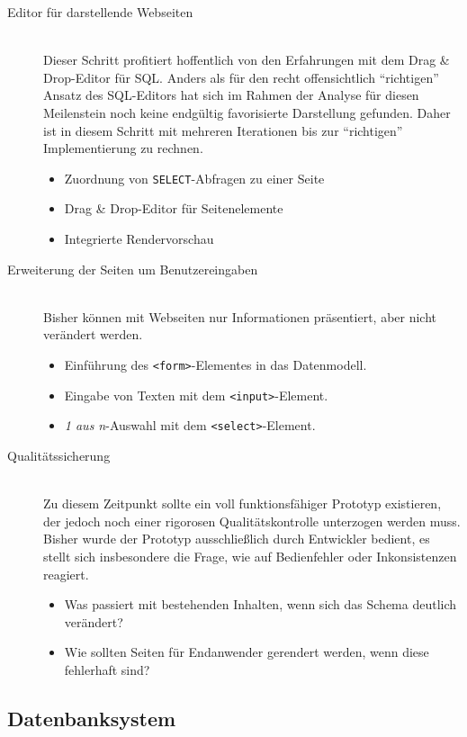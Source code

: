 \begin{description}
\item [Editor für darstellende Webseiten] \hfill \\
  Dieser Schritt profitiert hoffentlich von den Erfahrungen mit dem Drag \& Drop-Editor für SQL. Anders als für den recht offensichtlich "`richtigen"' Ansatz des SQL-Editors hat sich im Rahmen der Analyse für diesen Meilenstein noch keine endgültig favorisierte Darstellung gefunden. Daher ist in diesem Schritt mit mehreren Iterationen bis zur "`richtigen"' Implementierung zu rechnen.
  \begin{itemize}[noitemsep]
  \item Zuordnung von \texttt{SELECT}-Abfragen zu einer Seite
  \item Drag \& Drop-Editor für Seitenelemente
  \item Integrierte Rendervorschau
  \end{itemize}
  
\item[Erweiterung der Seiten um Benutzereingaben] \hfill \\
  Bisher können mit Webseiten nur Informationen präsentiert, aber nicht verändert werden.
  \begin{itemize}[noitemsep]
  \item Einführung des \texttt{<form>}-Elementes in das Datenmodell.
  \item Eingabe von Texten mit dem \texttt{<input>}-Element.
  \item \textit{1 aus n}-Auswahl mit dem \texttt{<select>}-Element.
  \end{itemize}
  
\item [Qualitätssicherung] \hfill \\
  Zu diesem Zeitpunkt sollte ein voll funktionsfähiger Prototyp existieren, der jedoch noch einer rigorosen Qualitätskontrolle unterzogen werden muss. Bisher wurde der Prototyp ausschließlich durch Entwickler bedient, es stellt sich insbesondere die Frage, wie \idename{} auf Bedienfehler oder Inkonsistenzen reagiert.
  \begin{itemize}[noitemsep]
  \item Was passiert mit bestehenden Inhalten, wenn sich das Schema deutlich verändert?
  \item Wie sollten Seiten für Endanwender gerendert werden, wenn diese fehlerhaft sind?
  \end{itemize}
\end{description}

\subsection{Datenbanksystem}
\label{sec:implementation-database-system}

